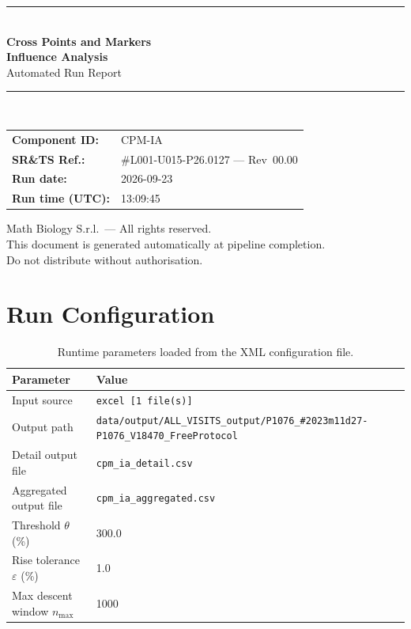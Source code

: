 \documentclass[a4paper,11pt]{article}
\begin{document}
\begin{titlepage}
\begin{center}
  \vspace*{1.8cm}
  {\color{dmaaccent}\rule{\linewidth}{1.5pt}}\\[0.6cm]
  {\LARGE\bfseries\color{dmaaccent}
    Cross Points and Markers\\[0.25cm]
    Influence Analysis}\\[0.4cm]
  {\Large Automated Run Report}\\[0.3cm]
  {\color{dmaaccent}\rule{\linewidth}{1.5pt}}\\[2cm]

  \begin{tabular}{ll}
    \textbf{Component ID:}   & CPM-IA \\[0.3cm]
    \textbf{SR\&TS Ref.:}    & \#L001-U015-P26.0127 --- Rev~00.00 \\[0.3cm]
    \textbf{Run date:}       & 2026-09-23 \\[0.3cm]
    \textbf{Run time (UTC):} & 13:09:45 \\
  \end{tabular}

  \vfill
  {\color{dmagray}\small
    Math Biology S.r.l.\ --- All rights reserved.\\
    This document is generated automatically at pipeline completion.\\
    Do not distribute without authorisation.}
\end{center}
\end{titlepage}

\tableofcontents
\clearpage

\section{Run Configuration}

\begin{table}[h!]
\centering
\small
\caption{Runtime parameters loaded from the XML configuration file.}
\begin{tabular}{ll}
\toprule
\textbf{Parameter} & \textbf{Value} \\
\midrule
Input source                      & \texttt{excel [1 file(s)]} \\
Output path                       & \texttt{data/output/ALL\_VISITS\_output/P1076\_\#2023m11d27-P1076\_V18470\_FreeProtocol} \\
Detail output file                & \texttt{cpm\_ia\_detail.csv} \\
Aggregated output file            & \texttt{cpm\_ia\_aggregated.csv} \\
Threshold $\theta$ (\%)           & 300.0 \\
Rise tolerance $\varepsilon$ (\%) & 1.0 \\
Max descent window $n_{\max}$     & 1000 \\
\bottomrule
\end{tabular}
\end{table}
\end{document}
